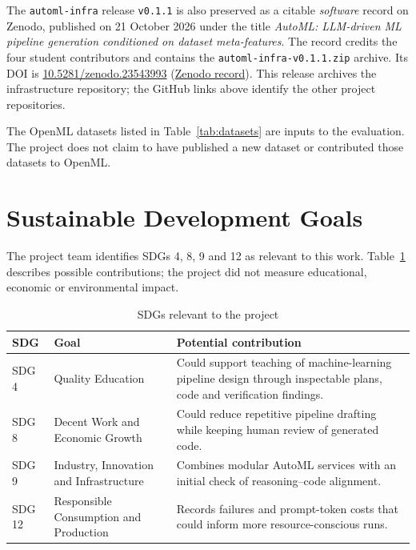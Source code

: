 The \texttt{automl-infra} release \texttt{v0.1.1} is also preserved as
a citable \emph{software} record on Zenodo, published on 21 October
2026 under the title \emph{AutoML: LLM-driven ML pipeline generation
conditioned on dataset meta-features}. The record credits the four
student contributors and contains the
\texttt{automl-infra-v0.1.1.zip} archive. Its DOI is
\href{https://doi.org/10.5281/zenodo.23543993}{10.5281/zenodo.23543993}
(\href{https://zenodo.org/records/23543993}{Zenodo record}). This
release archives the infrastructure repository; the GitHub links
above identify the other project repositories.

The OpenML datasets listed in Table~\ref{tab:datasets} are inputs to
the evaluation. The project does not claim to have published a new
dataset or contributed those datasets to OpenML.

\section{Sustainable Development Goals}

The project team identifies SDGs 4, 8, 9 and 12 as relevant to this
work. Table~\ref{tab:sdg} describes possible contributions; the
project did not measure educational, economic or environmental impact.

\begin{table}[H]
\centering
\caption{SDGs relevant to the project}
\label{tab:sdg}
\footnotesize
\setlength{\tabcolsep}{3pt}
\renewcommand{\arraystretch}{1.25}
\begin{tabular}{@{}
  >{\raggedright\arraybackslash}p{1.2cm}
  >{\raggedright\arraybackslash}p{3.3cm}
  >{\raggedright\arraybackslash}p{9.2cm}@{}}
\toprule
\textbf{SDG} & \textbf{Goal} & \textbf{Potential contribution} \\
\midrule
SDG 4 & Quality Education & Could support teaching of machine-learning
pipeline design through inspectable plans, code and verification findings. \\
SDG 8 & Decent Work and Economic Growth & Could reduce repetitive
pipeline drafting while keeping human review of generated code. \\
SDG 9 & Industry, Innovation and Infrastructure & Combines modular
AutoML services with an initial check of reasoning--code alignment. \\
SDG 12 & Responsible Consumption and Production & Records failures
and prompt-token costs that could inform more resource-conscious runs. \\
\bottomrule
\end{tabular}
\end{table}

